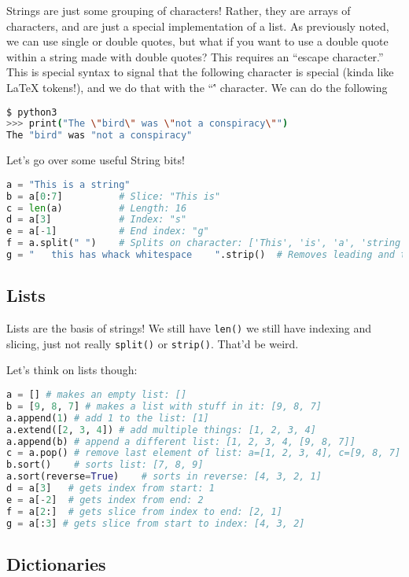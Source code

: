 \documentclass[12pt, twoside, reqno]{book}
\begin{document}
Strings are just some grouping of characters! Rather, they are arrays of characters, and are just a special implementation of a list. As previously noted, we can use single or double quotes, but what if you want to use a double quote within a string made with double quotes? This requires an ``escape character.'' This is special syntax to signal that the following character is special (kinda like LaTeX tokens!), and we do that with the ``\'' character. We can do the following
\begin{lstlisting}[language=sh]
$ python3
>>> print("The \"bird\" was \"not a conspiracy\"")
The "bird" was "not a conspiracy"
\end{lstlisting}

Let's go over some useful String bits!
\begin{lstlisting}[language=Python]
a = "This is a string"
b = a[0:7]          # Slice: "This is"
c = len(a)          # Length: 16
d = a[3]            # Index: "s"
e = a[-1]           # End index: "g"
f = a.split(" ")    # Splits on character: ['This', 'is', 'a', 'string']
g = "   this has whack whitespace    ".strip()  # Removes leading and trailing whitespace
\end{lstlisting}

\subsection{Lists}

Lists are the basis of strings! We still have \texttt{len()} we still have indexing and slicing, just not really \texttt{split()} or \texttt{strip()}. That'd be weird.

Let's think on lists though:
\begin{lstlisting}[language=Python]
a = [] # makes an empty list: []
b = [9, 8, 7] # makes a list with stuff in it: [9, 8, 7]
a.append(1) # add 1 to the list: [1]
a.extend([2, 3, 4]) # add multiple things: [1, 2, 3, 4]
a.append(b) # append a different list: [1, 2, 3, 4, [9, 8, 7]]
c = a.pop() # remove last element of list: a=[1, 2, 3, 4], c=[9, 8, 7]
b.sort()    # sorts list: [7, 8, 9]
a.sort(reverse=True)    # sorts in reverse: [4, 3, 2, 1]
d = a[3]   # gets index from start: 1
e = a[-2]  # gets index from end: 2
f = a[2:]  # gets slice from index to end: [2, 1]
g = a[:3] # gets slice from start to index: [4, 3, 2]
\end{lstlisting}

\subsection{Dictionaries}
\end{document}
